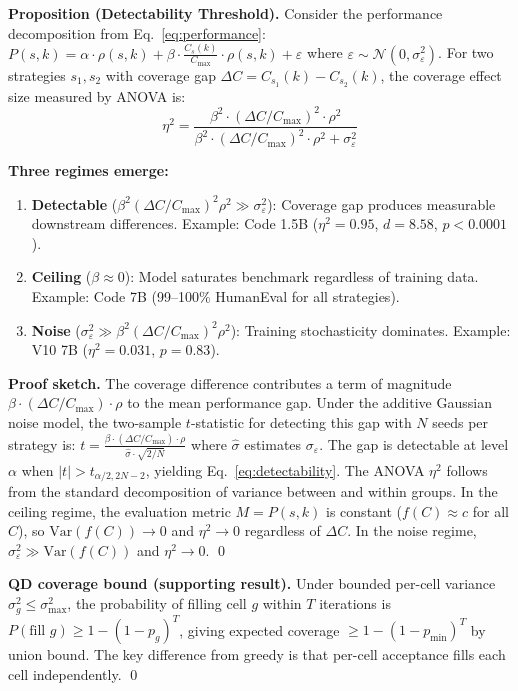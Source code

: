 \documentclass{article}
\begin{document}
\begin{enumerate}[nosep]
\textbf{Proposition (Detectability Threshold).}
Consider the performance decomposition from Eq.~\ref{eq:performance}:
$P(s,k) = \alpha \cdot \rho(s,k) + \beta \cdot \frac{C_s(k)}{C_{\max}} \cdot \rho(s,k) + \varepsilon$
where $\varepsilon \sim \mathcal{N}(0, \sigma^2_\varepsilon)$.
For two strategies $s_1, s_2$ with coverage gap $\Delta C = C_{s_1}(k) - C_{s_2}(k)$, the coverage effect size measured by ANOVA is:
\begin{equation}
\eta^2 = \frac{\beta^2 \cdot (\Delta C / C_{\max})^2 \cdot \rho^2}{\beta^2 \cdot (\Delta C / C_{\max})^2 \cdot \rho^2 + \sigma^2_\varepsilon}
\end{equation}

\textbf{Three regimes emerge:}
\begin{enumerate}[nosep]
  \item \textbf{Detectable} ($\beta^2 (\Delta C/C_{\max})^2 \rho^2 \gg \sigma^2_\varepsilon$): Coverage gap produces measurable downstream differences. Example: Code 1.5B ($\eta^2{=}0.95$, $d{=}8.58$, $p{<}0.0001$).
  \item \textbf{Ceiling} ($\beta \approx 0$): Model saturates benchmark regardless of training data. Example: Code 7B (99--100\% HumanEval for all strategies).
  \item \textbf{Noise} ($\sigma^2_\varepsilon \gg \beta^2 (\Delta C/C_{\max})^2 \rho^2$): Training stochasticity dominates. Example: V10 7B ($\eta^2{=}0.031$, $p{=}0.83$).
\end{enumerate}

\textbf{Proof sketch.}
The coverage difference contributes a term of magnitude $\beta \cdot (\Delta C / C_{\max}) \cdot \rho$ to the mean performance gap.
Under the additive Gaussian noise model, the two-sample $t$-statistic for detecting this gap with $N$ seeds per strategy is:
$t = \frac{\beta \cdot (\Delta C / C_{\max}) \cdot \rho}{\hat{\sigma} \cdot \sqrt{2/N}}$
where $\hat{\sigma}$ estimates $\sigma_\varepsilon$.
The gap is detectable at level $\alpha$ when $|t| > t_{\alpha/2, 2N-2}$, yielding Eq.~\ref{eq:detectability}.
The ANOVA $\eta^2$ follows from the standard decomposition of variance between and within groups.
In the ceiling regime, the evaluation metric $M = P(s,k)$ is constant ($f(C) \approx c$ for all $C$), so $\text{Var}(f(C)) \to 0$ and $\eta^2 \to 0$ regardless of $\Delta C$.
In the noise regime, $\sigma^2_\varepsilon \gg \text{Var}(f(C))$ and $\eta^2 \to 0$. \qed

\textbf{QD coverage bound (supporting result).}
Under bounded per-cell variance $\sigma^2_g \leq \sigma^2_{\max}$, the probability of filling cell $g$ within $T$ iterations is $P(\text{fill } g) \geq 1 - (1 - p_g)^T$, giving expected coverage $\geq 1 - (1-p_{\min})^T$ by union bound. The key difference from greedy is that per-cell acceptance fills each cell independently. \qed


\end{enumerate}
\end{document}
